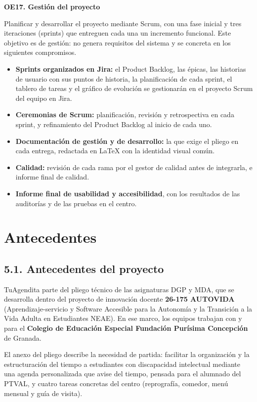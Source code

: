 \documentclass[11pt,a4paper]{article}
\newcommand{\hl}[1]{\textcolor{gblue}{\textbf{#1}}}
\begin{document}
\par\medskip
\noindent\colorbox{glight}{\parbox{\dimexpr\linewidth-2\fboxsep\relax}{\raggedright\hl{OE17. Gestión del proyecto}}}\par\nopagebreak
Planificar y desarrollar el proyecto mediante Scrum, con una fase inicial y tres iteraciones (sprints) que entreguen cada una un incremento funcional. Este objetivo es de gestión: no genera requisitos del sistema y se concreta en los siguientes compromisos.

\begin{itemize}
\item \hl{Sprints organizados en Jira:} el Product Backlog, las épicas, las historias de usuario con sus puntos de historia, la planificación de cada sprint, el tablero de tareas y el gráfico de evolución se gestionarán en el proyecto Scrum del equipo en Jira.
\item \hl{Ceremonias de Scrum:} planificación, revisión y retrospectiva en cada sprint, y refinamiento del Product Backlog al inicio de cada uno.
\item \hl{Documentación de gestión y de desarrollo:} la que exige el pliego en cada entrega, redactada en LaTeX con la identidad visual común.
\item \hl{Calidad:} revisión de cada rama por el gestor de calidad antes de integrarla, e informe final de calidad.
\item \hl{Informe final de usabilidad y accesibilidad}, con los resultados de las auditorías y de las pruebas en el centro.
\end{itemize}

\section{Antecedentes}
\subsection*{5.1. Antecedentes del proyecto}
TuAgendita parte del pliego técnico de las asignaturas DGP y MDA, que se desarrolla dentro del proyecto de innovación docente \hl{26-175 AUTOVIDA} (Aprendizaje-servicio y Software Accesible para la Autonomía y la Transición a la Vida Adulta en Estudiantes NEAE). En ese marco, los equipos trabajan con y para el \hl{Colegio de Educación Especial Fundación Purísima Concepción} de Granada.

El anexo del pliego describe la necesidad de partida: facilitar la organización y la estructuración del tiempo a estudiantes con discapacidad intelectual mediante una agenda personalizada que avise del tiempo, pensada para el alumnado del PTVAL, y cuatro tareas concretas del centro (reprografía, comedor, menú mensual y guía de visita).
\end{document}
